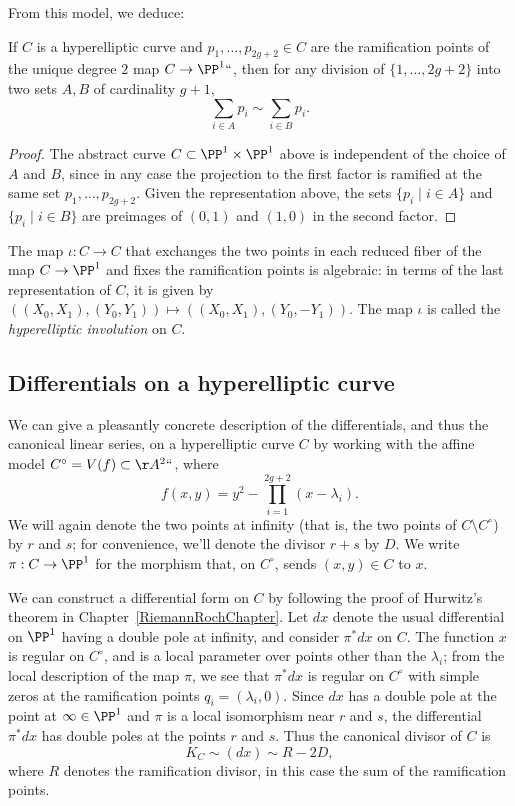 From this model, we deduce:

\begin{corollary}
\label{relation on ramification points}
If $C$ is a hyperelliptic curve  and $p_1,\dots,p_{2g+2} \in C$ are the
ramification points of the unique degree $2$ map $C \to \PP^1` `$, then for any
division of $\{1,\dots,2g+2\}$ into two sets $A,B$ of cardinality $g+1$,
$$
\sum_{i\in A} p_{i}   \sim  \sum_{i\in B}p_{i}.
$$
\end{corollary}

\begin{proof}
The abstract curve $C\subset \PP^{1}\times \PP^{1}$ above
is independent of the
choice of $A$ and $B$,
since in any case the projection to the
first factor
is ramified at the same set $p_{1}, \dots, p_{2g+2}$. Given the
representation above, the sets
$\{p_i\mid i\in A\}$ and  $\{p_i\mid i\in B\}$
are
preimages of $(0,1)$ and
$(1,0)$ in the second factor.
\end{proof}

 The map $\iota : C \to C$ that exchanges the two points in each reduced
 fiber of the map $C \to \PP^1$ and fixes the ramification points is
 algebraic: in terms of the last representation of $C$, it is given by
 $((X_0,X_1), (Y_0,Y_1)) \mapsto  ((X_0,X_1), (Y_0,-Y_1)) $. The map
%
 $\iota$ is called the \emph{hyperelliptic involution} on $C$.

\subsection*{Differentials on a hyperelliptic curve}

We can give a pleasantly concrete \null description of the differentials,
and thus the
canonical linear series,
%
on a hyperelliptic curve $C$
by working with the affine model $C^\circ = V(f) \subset \AA^2` `$, where
$$
f(x,y) = y^2 - \prod_{i=1}^{2g+2} (x - \lambda_i).
$$
We will again denote the two points at infinity (that is, the two points
of $C \setminus C^\circ$) by $r$ and $s$; for convenience, we'll denote
the divisor $r+s$ by $D$. We write $\pi:C \to \PP^1$ for the morphism
that, on $C^\circ$, sends $(x,y) \in C$ to $x$.

We can construct a differential form on $C$ by following the proof of
Hurwitz's theorem
%
in
Chapter~\ref{RiemannRochChapter}.
Let $dx$ denote the usual differential on $\PP^1$ having a double
pole at infinity, and consider $\pi^*dx$ on $C$.  The function $x$ is
regular on $C^\circ$, and is a local parameter over points other than
the $\lambda_i$; from the local description of the map $\pi$, we see that
$\pi^*dx$ is regular on $C^\circ$  with simple zeros at the ramification
points $q_i = (\lambda_i, 0)$. Since $dx$ has a double pole at the
point at $\infty\in \PP^1$ and $\pi$ is a local isomorphism near $r$
and $s$, the differential $\pi^*dx$ has double poles at the points $r$
and $s$. Thus the canonical
divisor of $C$ is
$$
 K_C \sim (dx) \sim R - 2D,
$$
where $R$ denotes the ramification divisor, in this case the sum of the
ramification points.

